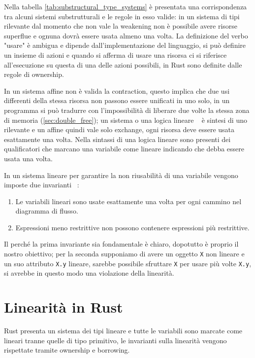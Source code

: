 \documentclass[Lau,binding=0.6cm]{sapthesis}
\begin{document}
Nella tabella \ref{tab:substructural_type_systems} è presentata una corrispondenza tra alcuni sistemi substrutturali e le regole in esso valide: in un sistema di tipi rilevante dal momento che non vale la weakening non è possibile avere risorse superflue e ognuna dovrà essere usata almeno una volta. 
La definizione del verbo "usare" è ambigua e dipende dall'implementazione del linguaggio, si può definire un insieme di azioni e quando si afferma di usare una risorsa ci si riferisce all'esecuzione su questa di una delle azioni possibili, in Rust sono definite dalle regole di ownership.

In un sistema affine non è valida la contraction, questo implica che due usi differenti della stessa risorsa non passono essere unificati in uno solo, in un programma si può tradurre con l'impossibilità di liberare due volte la stessa zona di memoria (\ref{sec:double_free}); un sistema o una logica lineare ~\cite{girard:linear_logic} è sintesi di uno rilevante e un affine quindi vale solo exchange, ogni risorsa deve essere usata esattamente una volta.
Nella sintassi di una logica lineare sono presenti dei qualificatori che marcano una variabile come lineare indicando che debba essere usata una volta.

In un sistema lineare per garantire la non riusabilità di una variabile vengono imposte due invarianti ~\cite{walker:linear_logic}:

\begin{enumerate}
    \item Le variabili lineari sono usate esattamente una volta per ogni cammino nel diagramma di flusso.
    \item Espressioni meno restrittive non possono contenere espressioni più restrittive. 
\end{enumerate}

Il perché la prima invariante sia fondamentale è chiaro, dopotutto è proprio il nostro obiettivo; per la seconda supponiamo di avere un oggetto \texttt{X} non lineare e un suo attributo \texttt{X.y} lineare, sarebbe possibile sfruttare \texttt{X} per usare più volte \texttt{X.y}, si avrebbe in questo modo una violazione della linearità. 

\section{Linearità in Rust}

Rust presenta un sistema dei tipi lineare e tutte le variabili sono marcate come lineari tranne quelle di tipo primitivo, le invarianti sulla linearità vengono rispettate tramite ownership e borrowing.
\end{document}
